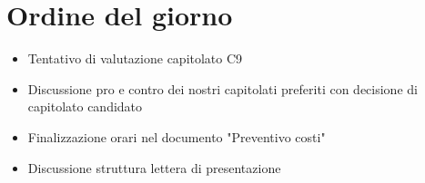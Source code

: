 \section{Ordine del giorno}

\begin{itemize}
    \item	Tentativo di valutazione capitolato C9
    \item	Discussione pro e contro dei nostri capitolati preferiti con decisione di capitolato candidato
    \item	Finalizzazione orari nel documento "Preventivo costi"
    \item	Discussione struttura lettera di presentazione

\end{itemize}